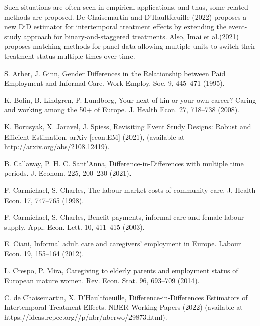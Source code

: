 \documentclass{article}
\theoremstyle{definition}
\begin{document}
Such situations are often seen in empirical applications, and thus, some related methods are proposed. De Chaisemartin and D'Haultfœuille (2022) proposes a new DiD estimator for intertemporal treatment effects by extending the event-study approach for binary-and-staggered treatments. Also, Imai et al.(2021) proposes matching methods for panel data allowing multiple units to switch their treatment status multiple times over time. 


\begin{thebibliography}{99}
    \item S. Arber, J. Ginn, Gender Differences in the Relationship between Paid Employment and Informal Care. Work Employ. Soc. 9, 445–471 (1995).

    \item K. Bolin, B. Lindgren, P. Lundborg, Your next of kin or your own career? Caring and working among the 50+ of Europe. J. Health Econ. 27, 718–738 (2008).
    
    \item K. Borusyak, X. Jaravel, J. Spiess, Revisiting Event Study Designs: Robust and Efficient Estimation. arXiv [econ.EM] (2021), (available at http://arxiv.org/abs/2108.12419).
    
    \item B. Callaway, P. H. C. Sant’Anna, Difference-in-Differences with multiple time periods. J. Econom. 225, 200–230 (2021).
    
    \item F. Carmichael, S. Charles, The labour market costs of community care. J. Health Econ. 17, 747–765 (1998).
    
    \item F. Carmichael, S. Charles, Benefit payments, informal care and female labour supply. Appl. Econ. Lett. 10, 411–415 (2003).
    
    \item E. Ciani, Informal adult care and caregivers’ employment in Europe. Labour Econ. 19, 155–164 (2012).
    
    \item L. Crespo, P. Mira, Caregiving to elderly parents and employment status of European mature women. Rev. Econ. Stat. 96, 693–709 (2014).
    
    \item C. de Chaisemartin, X. D’Haultfoeuille, Difference-in-Differences Estimators of Intertemporal Treatment Effects. NBER Working Papers (2022) (available at https://ideas.repec.org//p/nbr/nberwo/29873.html).
    

\end{thebibliography}
\end{document}
